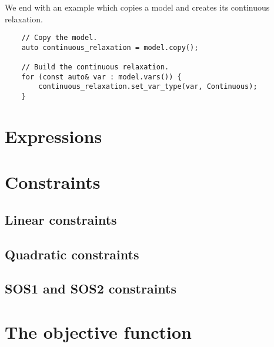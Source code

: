 We end with an example which copies a model and creates its continuous
relaxation.

\begin{lstlisting}
    // Copy the model.
    auto continuous_relaxation = model.copy();

    // Build the continuous relaxation. 
    for (const auto& var : model.vars()) {
        continuous_relaxation.set_var_type(var, Continuous);
    }
\end{lstlisting}

\section{Expressions}
\label{sec:expressions}

\section{Constraints}

\subsection{Linear constraints}

\subsection{Quadratic constraints}

\subsection{SOS1 and SOS2 constraints}

\section{The objective function}
